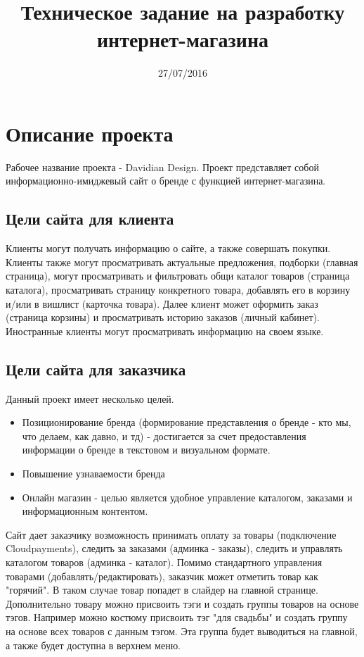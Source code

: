 \documentclass[DIV=calc, paper=a4, fontsize=11pt]{scrartcl} %
\title{Техническое задание на разработку интернет-магазина}
\date{27/07/2016}
\begin{document}
\maketitle

\section{Описание проекта}
Рабочее название проекта - Davidian Design. Проект представляет собой информационно-имиджевый сайт о бренде с функцией интернет-магазина.

\subsection{Цели сайта для клиента}

Клиенты могут получать информацию о сайте, а также совершать покупки.
Клиенты также могут просматривать актуальные предложения, подборки (главная страница), могут просматривать и фильтровать общи каталог товаров (страница каталога), просматривать страницу конкретного товара, добавлять его в корзину и/или в вишлист (карточка товара). Далее клиент может оформить заказ (страница корзины) и просматривать историю заказов (личный кабинет).
Иностранные клиенты могут просматривать информацию на своем языке. 

\subsection{Цели сайта для заказчика}

Данный проект имеет несколько целей.
\begin{itemize}
	\item Позиционирование бренда (формирование представления о бренде - кто мы, что делаем, как давно, и тд) - достигается за счет предоставления информации о бренде в текстовом и визуальном формате.
	\item Повышение узнаваемости бренда
	\item Онлайн магазин - целью является удобное управление каталогом, заказами и информационным контентом.
\end{itemize}
Сайт дает заказчику возможность принимать оплату за товары (подключение Cloudpayments), следить за заказами (админка - заказы), следить и управлять каталогом товаров (админка - каталог). Помимо стандартного управления товарами (добавлять/редактировать), заказчик может отметить товар как "горячий". В таком случае товар попадет в слайдер на главной странице.
\\[0.5cm]
Дополнительно товару можно присвоить тэги и создать группы товаров на основе тэгов. Например можно костюму присвоить тэг "для свадьбы" и создать группу на основе всех товаров с данным тэгом. Эта группа будет выводиться на главной, а также будет доступна в верхнем меню.
\end{document}
